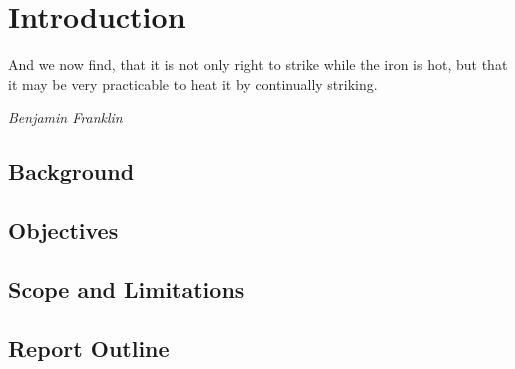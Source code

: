 \documentclass[class=report,11pt,crop=false]{standalone}
\begin{document}
\chapter{Introduction}
\epigraph{And we now find, that it is not only right to strike while the iron is hot, but that it may be very practicable to heat it by continually striking.}%
    {\emph{Benjamin Franklin}}

\section{Background}

\blindtext

\section{Objectives}

\blindtext

\section{Scope and Limitations}

\blindtext

\section{Report Outline}

\blindtext










\ifstandalone

\fi
\end{document}

